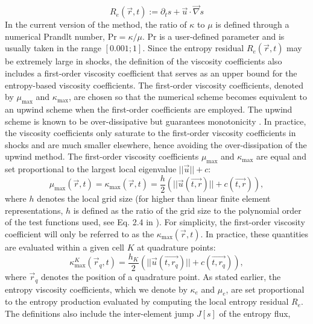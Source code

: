 \documentclass[preprint,10pt]{elsarticle}
\newcommand{\grad}{\vec{\nabla}}
\renewcommand{\Pr}{\textrm{Pr}}
\newcommand{\resi}{R_e}
\begin{document}
%
\begin{equation}
\label{eq:ent_residual}
\resi(\vec{r}, t) := \partial_t s + \vec{u} \cdot \grad s
\end{equation}
%
In the current version of the method, the ratio of $\kappa$ to $\mu$ is defined through a numerical Prandlt number, $\Pr = \kappa / \mu$.  $\Pr$ is a user-defined parameter and is usually taken in the range $[ 0.001; 1 ]$. Since the entropy residual $\resi(\vec{r},t)$ may be extremely large in shocks, the definition of the viscosity coefficients also includes a first-order viscosity coefficient that serves as an upper bound for the entropy-based viscosity coefficients. The first-order viscosity coefficients, denoted by $\mu_{\max}$ and $\kappa_{\max}$, are chosen so that the numerical scheme becomes equivalent to an upwind scheme when the first-order coefficients are employed. The upwind scheme is known to be over-dissipative but guarantees monotonicity \cite{Toro}. In practice, the viscosity coefficients only saturate to the first-order viscosity coefficients in shocks and are much smaller elsewhere, hence avoiding the over-dissipation of the upwind method.  The first-order viscosity coefficients $\mu_{\max}$ and $\kappa_{\max}$ are equal and set proportional to the largest local eigenvalue $|| \vec{u} || + c $:
%
\begin{equation}
\label{eq:fo}
\mu_{\max}(\vec{r}, t) = \kappa_{\max}(\vec{r}, t) = \frac{h}{2} \left( || \vec{u}(\vec{t,r}) || + c(\vec{t,r}) \right),
\end{equation}
%
where $h$ denotes the local grid size (for higher than linear finite element representations, $h$ is defined as the ratio of the grid size to the polynomial order of the test functions used, see Eq. 2.4 in \cite{valentin}). For simplicity, the first-order viscosity coefficient will only be referred to as the $\kappa_{\max}(\vec{r}, t)$. In practice, these quantities are evaluated within a given cell $K$ at quadrature points:
%
\begin{equation}
\label{eq:fo_quad}
\kappa^K_{\max}(\vec{r}_q, t) = \frac{h_K}{2} \left( || \vec{u}(\vec{t,r_q}) || + c(\vec{t,r_q}) \right),
\end{equation}
%
where $\vec{r}_q$ denotes the position of a quadrature point.
As stated earlier, the entropy viscosity coefficients, which we denote by $\kappa_e$ and $\mu_e$, are set proportional to the entropy production evaluated by computing the local entropy residual $\resi$. The definitions also include the inter-element jump $J[s]$ of the entropy flux, %
\end{document}
